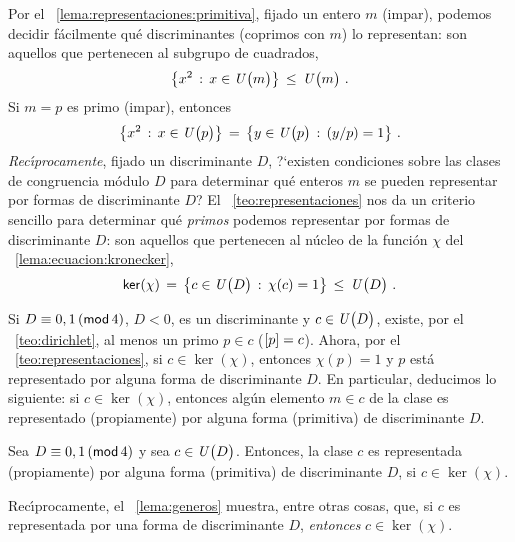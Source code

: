 Por el \lemaname~\ref{lema:representaciones:primitiva}, fijado un entero
$m$ (impar), podemos decidir f\'acilmente qu\'e discriminantes (coprimos
con $m$) lo representan:
son aquellos que pertenecen al subgrupo de cuadrados,
\begin{displaymath}
	\big\{ x^2\,:\,x\in\Unidadesmod[m] \big\}\,\leq\,\Unidadesmod[m]
	\dispstop
\end{displaymath}
%
Si $m=p$ es primo (impar), entonces
\begin{displaymath}
	\big\{ x^2\,:\,x\in\Unidadesmod[p] \big\}\,=\,
		\big\{ y\in\Unidadesmod[p]\,:\,\tlegendre y p=1\big\}
	\dispstop
\end{displaymath}
%
\emph{Rec\'{\i}procamente}, fijado un discriminante $D$,
?`existen condiciones sobre las clases de congruencia m\'odulo $D$
para determinar qu\'e enteros $m$ se pueden representar por formas de
discriminante $D$?
El \teoname~\ref{teo:representaciones} nos da un criterio sencillo
para determinar qu\'e \emph{primos} podemos representar por formas
de discriminante $D$:
son aquellos que pertenecen al n\'ucleo de la funci\'on $\chi$ del
\lemaname~\ref{lema:ecuacion:kronecker},
\begin{displaymath}
	\ker(\chi)\,=\,\big\{c\in\Unidadesmod[D]\,:\,\chi(c)=1\big\}
		\,\leq\,\Unidadesmod[D]
	\dispstop
\end{displaymath}
%

Si $D\equiv 0,1\tmodulo[4]$, $D<0$, es un discriminante y
$c\in\Unidadesmod[D]$, existe, por el \teoname~\ref{teo:dirichlet},
al menos un primo $p\in c$ ($\clase p=c$).
Ahora, por el \teoname~\ref{teo:representaciones}, si $c\in\ker(\chi)$,
entonces $\chi(p)=1$ y $p$ est\'a representado por alguna forma
de discriminante $D$. En particular, deducimos lo siguiente:
si $c\in\ker(\chi)$, entonces alg\'un elemento $m\in c$ de la clase
es representado (propiamente) por alguna forma (primitiva) de
discriminante $D$.

\begin{coroDirichlet}\label{coro:dirichlet}
	Sea $D\equiv 0,1\tmodulo[4]$ y sea $c\in\Unidadesmod[D]$.
	Entonces, la clase $c$ es representada (propiamente) por
	alguna forma (primitiva) de discriminante $D$, si $c\in\ker(\chi)$.
\end{coroDirichlet}

\begin{obsDirichlet}\label{obs:dirichlet:generos}
	Rec\'{\i}procamente, el \lemaname~\ref{lema:generos} muestra,
	entre otras cosas, que, si $c$ es representada por una forma
	de discriminante $D$, \emph{entonces} $c\in\ker(\chi)$.
\end{obsDirichlet}

